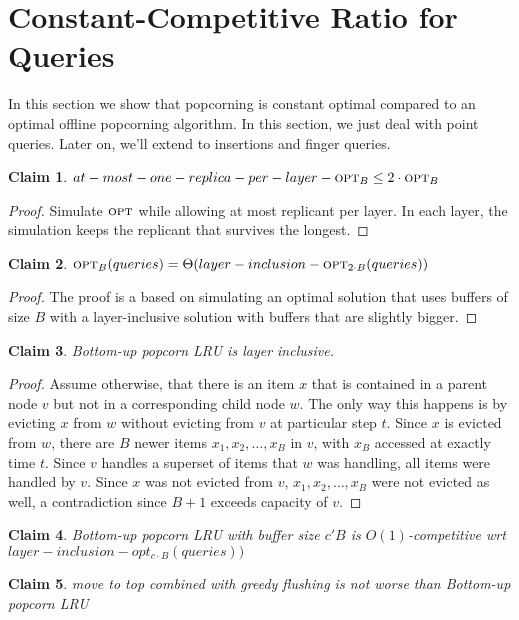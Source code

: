 \documentclass[a4paper,UKenglish]{lipics-v2016}
\newtheorem{claim}{Claim}%
\newcommand{\opt}{\mbox{\sc opt}}
\begin{document}
\section{Constant-Competitive Ratio for Queries}
In this section we show that popcorning is constant optimal compared to an optimal offline popcorning algorithm. 
In this section, we just deal with point queries.  Later on, we'll extend to insertions and finger queries. 

\begin{claim}
 $at-most-one-replica-per-layer-\opt_B \leq 2\cdot\opt_B$
\end{claim}
\begin{proof}
Simulate $\opt$ while allowing at most replicant per layer. In each layer, the simulation keeps the replicant that survives the longest.
\end{proof}
\begin{claim}
$\opt_B(queries) =\Theta(layer-inclusion-
\opt_{2\cdot B}(queries))$
\end{claim}
\begin{proof}
The proof is a based on simulating an optimal solution that uses buffers of size $B$ with a layer-inclusive solution with buffers that are slightly bigger.

\end{proof}
\begin{claim}
Bottom-up popcorn LRU is layer inclusive.
\end{claim}

\begin{proof}
Assume otherwise, that there is an item $x$ that is contained in a parent node $v$ but not in a corresponding child node $w$. The only way this happens is by evicting $x$ from $w$ without evicting from $v$ at particular step $t$. Since $x$ is evicted from $w$, there are $B$ newer items $x_1,x_2,\dots,x_B$ in $v$, with $x_B$ accessed at exactly time $t$. Since $v$ handles a superset of items that $w$ was handling, all items were handled by $v$. Since $x$ was not evicted from $v$, $x_1,x_2,\dots,x_B$ were not evicted as well, a contradiction since $B+1$ exceeds capacity of $v$.
\end{proof}
\begin{claim}
Bottom-up popcorn LRU with buffer size $c'B$ is $O(1)$-competitive
wrt $layer-inclusion-opt_{c\cdot B}(queries))$
\end{claim}

\begin{claim}
move to top combined with greedy flushing is not worse than
Bottom-up popcorn LRU 
\end{claim}
\end{document}
